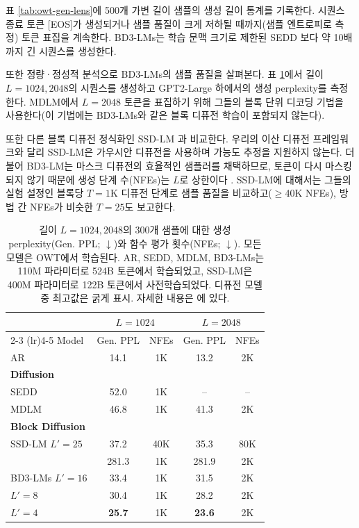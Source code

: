 \documentclass{article} %
\def\algos{BD3-LMs}
\def\algo{BD3-LM}
\begin{document}
표 \ref{tab:owt-gen-lens}에 500개 가변 길이 샘플의 생성 길이 통계를 기록한다. 시퀀스 종료 토큰 [EOS]가 생성되거나 샘플 품질이 크게 저하될 때까지(샘플 엔트로피로 측정) 토큰 표집을 계속한다. \algos{}는 학습 문맥 크기로 제한된 SEDD \citep{lou2024discrete}보다 약 10배까지 긴 시퀀스를 생성한다.

또한 정량·정성적 분석으로 \algos{}의 샘플 품질을 살펴본다. 표 \ref{tab:gen_ppl_2048}에서 길이 $L=1024, 2048$의 시퀀스를 생성하고 GPT2-Large 하에서의 생성 perplexity를 측정한다. MDLM에서 $L=2048$ 토큰을 표집하기 위해 그들의 블록 단위 디코딩 기법을 사용한다(이 기법에는 \algos{}와 같은 블록 디퓨전 학습이 포함되지 않는다).

또한 다른 블록 디퓨전 정식화인 SSD-LM \citep{han2022ssd}과 비교한다. 우리의 이산 디퓨전 프레임워크와 달리 SSD-LM은 가우시안 디퓨전을 사용하며 가능도 추정을 지원하지 않는다. 더불어 \algo{}는 마스크 디퓨전의 효율적인 샘플러를 채택하므로, 토큰이 다시 마스킹되지 않기 때문에 생성 단계 수(NFEs)는 $L$로 상한이다 \citep{sahoo2024simple, ou2025your}. SSD-LM에 대해서는 그들의 실험 설정인 블록당 $T=1$K 디퓨전 단계로 샘플 품질을 비교하고($\geq$40K NFEs), 방법 간 NFEs가 비슷한 $T=25$도 보고한다.


\begin{table}[ht!]
    \small
  \caption{길이 $L=1024, 2048$의 300개 샘플에 대한 생성 perplexity(Gen. PPL; $\downarrow$)와 함수 평가 횟수(NFEs; $\downarrow$). 모든 모델은 OWT에서 학습된다. AR, SEDD, MDLM, \algos{}는 110M 파라미터로 524B 토큰에서 학습되었고, SSD-LM은 400M 파라미터로 122B 토큰에서 사전학습되었다. 디퓨전 모델 중 최고값은 굵게 표시. 자세한 내용은 에 있다.}
  \label{tab:gen_ppl_2048}
  \centering
    \begin{tabular}{lcccc}
      \toprule
      & \multicolumn{2}{c}{$L=1024$} & \multicolumn{2}{c}{$L=2048$} \\
      \cmidrule(lr){2-3} \cmidrule(lr){4-5}
      Model & Gen. PPL & NFEs & Gen. PPL & NFEs \\
      \midrule
      AR & 14.1 & 1K & 13.2 & 2K \\
      \midrule 
      \multicolumn{5}{l}{\textbf{Diffusion}} \\
      SEDD & 52.0 & 1K & -- & -- \\
      MDLM & 46.8 & 1K & 41.3 & 2K \\
      \midrule
      \multicolumn{5}{l}{\textbf{Block Diffusion}} \\
      SSD-LM $L'=25$ & 37.2 & 40K & 35.3 & 80K  \\
      & 281.3 & 1K & 281.9 & 2K  \\
      \algos{} $L'=16$ & 33.4 & 1K & 31.5 & 2K \\
      \hspace{4.1em} $L'=8$ & 30.4 & 1K & 28.2 & 2K \\
      \hspace{4.1em} $L'=4$ & \textbf{25.7} & 1K & \textbf{23.6} & 2K \\
      \bottomrule
    \end{tabular}
\end{table}
\end{document}
